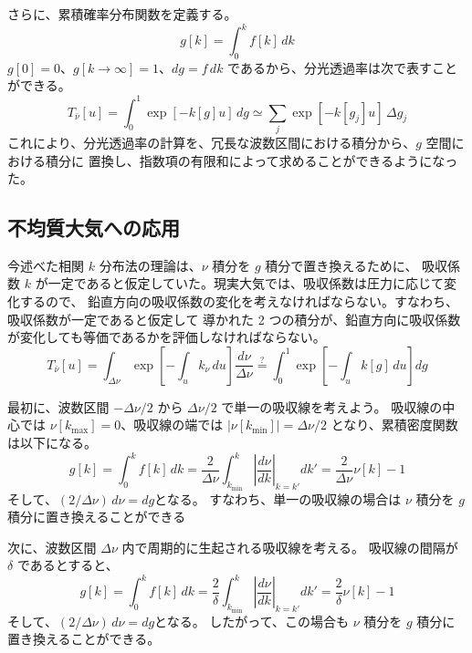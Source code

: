 \documentclass[book]{dennou777}
\newcommand{\hmeqq}{\stackrel{\mathrm{?}}{=}}
\begin{document}
さらに、累積確率分布関数を定義する。
\begin{equation}
	g[k]=\int^k_0 f[k]\,dk
\end{equation}
$g[0]=0$、$g[k\to\infty]=1$、$dg=f\,dk$ であるから、分光透過率は次で表すことができる。
\begin{equation}
	T_{\bar\nu}[u]=\int^1_0 \exp[-k[g]u]\,dg\simeq\sum_j\exp[-k[g_j]u]\,\Delta g_j
\end{equation}
これにより、分光透過率の計算を、冗長な波数区間における積分から、$g$ 空間における積分に
置換し、指数項の有限和によって求めることができるようになった。

\subsection{不均質大気への応用}
今述べた相関 $k$ 分布法の理論は、$\nu$ 積分を $g$ 積分で置き換えるために、
吸収係数 $k$ が一定であると仮定していた。現実大気では、吸収係数は圧力に応じて変化するので、
鉛直方向の吸収係数の変化を考えなければならない。すなわち、吸収係数が一定であると仮定して
導かれた 2 つの積分が、鉛直方向に吸収係数が変化しても等価であるかを評価しなければならない。
\begin{equation}
	T_{\bar\nu}[u]
	=\int_{\Delta\nu}\exp\left[-\int_u k_\nu\,du\right]\frac{d\nu}{\Delta\nu}
	\hmeqq\int^1_0\exp\left[-\int_uk[g]\,du\right]dg
\end{equation}

最初に、波数区間 $-\Delta\nu/2$ から $\Delta\nu/2$ で単一の吸収線を考えよう。
吸収線の中心では $\nu[k_{\mathrm{max}}]=0$、吸収線の端では
$|\nu[k_{\mathrm{min}}]|=\Delta\nu/2$ となり、累積密度関数は以下になる。
\begin{equation}
	g[k]=\int^k_0 f[k]\,dk
	=\frac{2}{\Delta\nu}\int^k_{k_{\mathrm{min}}}\left|\frac{d\nu}{dk}\right|_{k=k'}dk'
	=\frac{2}{\Delta\nu}\nu[k]-1
\end{equation}
そして、$(2/\Delta\nu)\,d\nu=dg$となる。
すなわち、単一の吸収線の場合は $\nu$ 積分を $g$ 積分に置き換えることができる

次に、波数区間 $\Delta\nu$ 内で周期的に生起される吸収線を考える。
吸収線の間隔が $\delta$ であるとすると、
\begin{equation}
	g[k]=\int^k_0 f[k]\,dk
	=\frac{2}{\delta}\int^k_{k_{\mathrm{min}}}\left|\frac{d\nu}{dk}\right|_{k=k'}dk'
	=\frac{2}{\delta}\nu[k]-1
\end{equation}
そして、$(2/\Delta\nu)\,d\nu=dg$となる。
したがって、この場合も $\nu$ 積分を $g$ 積分に置き換えることができる。
\end{document}
